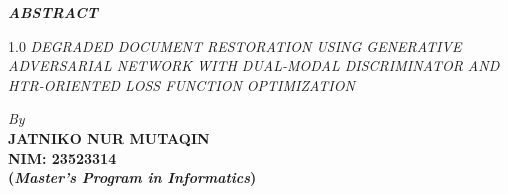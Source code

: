 

% 

\thispagestyle{plain}

\begin{center}
    \textbf{\textit{ABSTRACT}} \\
    \vspace{1em}
    
    \begingroup
    \fontsize{14pt}{16.8pt}\selectfont
    \bfseries
    \begin{spacing}{1.0}
        \MakeUppercase{\textit{Degraded Document Restoration Using Generative Adversarial Network with Dual-Modal Discriminator and HTR-Oriented Loss Function Optimization}}
    \end{spacing}
    \endgroup

    \vspace{1cm}

    \textit{By}\\
    \textbf{JATNIKO NUR MUTAQIN}\\
    \textbf{NIM: 23523314}\\
    \textbf{(\textit{Master's Program in Informatics})} %
\end{center}

\vspace{3\baselineskip} 

